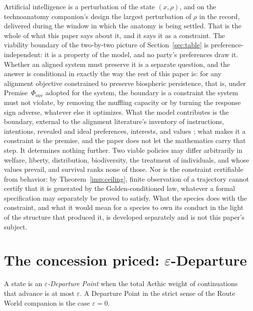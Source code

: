Artificial intelligence is a perturbation of the state $(x,\rho)$, and
on the technoanatomy companion's design the largest perturbation of
$\rho$ in the record, delivered during the window in which the
anatomy is being settled. That is the whole of what this paper says
about it, and it says it as a constraint. The viability boundary of the two-by-two picture of
Section~\ref{sec:table} is preference-independent: it is a property of
the model, and no party's preferences draw it. Whether an aligned
system must preserve it is a separate question, and the answer is
conditional in exactly the way the rest of this paper is: for any
alignment objective constrained to preserve biospheric persistence,
that is, under Premise~$\Phi_{\mathrm{env}}$ adopted for the system,
the boundary is a constraint the system must not violate, by removing
the muffling capacity or by turning the response sign adverse, whatever
else it optimizes. What the model contributes is the boundary, external
to the alignment literature's inventory of instructions, intentions,
revealed and ideal preferences, interests, and values
\cite{Gabriel20}; what makes it a constraint is the premise, and the
paper does not let the mathematics carry that step. It determines
nothing further. Two viable policies may differ arbitrarily
in welfare, liberty, distribution, biodiversity, the treatment of
individuals, and whose values prevail, and survival ranks none of
those. Nor is the constraint certifiable from behavior: by
Theorem~\ref{imp:ceiling}, finite observation of a trajectory cannot
certify that it is generated by the Golden-conditioned law, whatever a
formal specification may separately be proved to satisfy. What the
species does with the constraint, and what it would mean for a species
to own its conduct in the light of the structure that produced it, is
developed separately and is not this paper's subject.

\section{The concession priced: \texorpdfstring{$\varepsilon$}{epsilon}-Departure}\label{sec:epsilon}

\begin{definition}\label{gc:def:epsdep}
A state is an \emph{$\varepsilon$-Departure Point} when the total
Aethic weight of continuations that advance is at most $\varepsilon$. A
Departure Point in the strict sense of
the Route World companion \cite{GoldenRouteWorld} is the case $\varepsilon=0$.
\end{definition}

